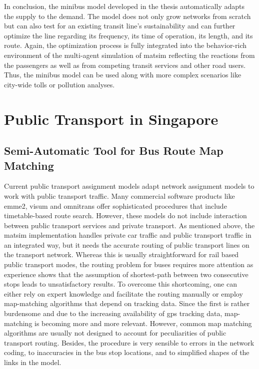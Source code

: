 In conclusion, the minibus model developed in the thesis automatically adapts the supply to the demand. The model does not only grow networks from scratch but can also test for an existing transit line's sustainability and can further optimize the line regarding its frequency, its time of operation, its length, and its route. Again, the optimization process is fully integrated into the behavior-rich environment of the multi-agent simulation of \gls{matsim} reflecting the reactions from the passengers as well as from competing transit services and other road users. Thus, the minibus model can be used along with more complex scenarios like city-wide tolls or pollution analyses.

\section{Public Transport in Singapore}
\subsection{Semi-Automatic Tool for Bus Route Map Matching}
\label{sec:SemiTool}
Current public transport assignment models adapt network assignment models to work with public transport traffic. Many commercial software products like \gls{emme2}, \gls{visum} and \gls{omnitrans} offer sophisticated procedures that include timetable-based route search. However, these models do not include interaction between public transport services and private transport. As mentioned above, the \gls{matsim} implementation handles private car traffic and public transport traffic in an integrated way, but it needs the accurate routing of public transport lines on the transport network. Whereas this is usually straightforward for rail based public transport modes, the routing problem for buses requires more attention as experience shows that the assumption of shortest-path between two consecutive stops leads to unsatisfactory results. To overcome this shortcoming, one can either rely on expert knowledge and facilitate the routing manually or employ map-matching algorithms that depend on tracking data. Since the first is rather burdensome and due to the increasing availability of \gls{gps} tracking data, map-matching is becoming more and more relevant. However, common map matching algorithms are usually not designed to account for peculiarities of public transport routing. Besides, the procedure is very sensible to errors in the network coding, to inaccuracies in the bus stop locations, and to simplified shapes of the links in the model.

